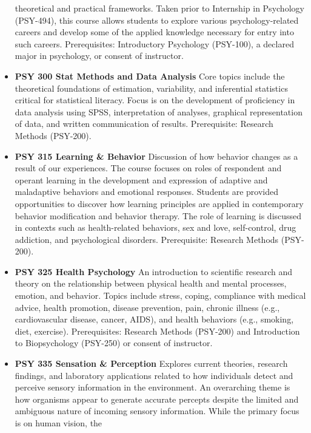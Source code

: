 \documentclass[
  letterpaper,
]{scrbook}
\begin{document}
\begin{itemize}
  theoretical and practical frameworks. Taken prior to Internship in
  Psychology (PSY-494), this course allows students to explore various
  psychology-related careers and develop some of the applied knowledge
  necessary for entry into such careers. Prerequisites: Introductory
  Psychology (PSY-100), a declared major in psychology, or consent of
  instructor.\\
\item
  \textbf{PSY 300 Stat Methods and Data Analysis} Core topics include
  the theoretical foundations of estimation, variability, and
  inferential statistics critical for statistical literacy. Focus is on
  the development of proficiency in data analysis using SPSS,
  interpretation of analyses, graphical representation of data, and
  written communication of results. Prerequisite: Research Methods
  (PSY-200).
\item
  \textbf{PSY 315 Learning \& Behavior} Discussion of how behavior
  changes as a result of our experiences. The course focuses on roles of
  respondent and operant learning in the development and expression of
  adaptive and maladaptive behaviors and emotional responses. Students
  are provided opportunities to discover how learning principles are
  applied in contemporary behavior modification and behavior therapy.
  The role of learning is discussed in contexts such as health-related
  behaviors, sex and love, self-control, drug addiction, and
  psychological disorders. Prerequisite: Research Methods (PSY-200).\\
\item
  \textbf{PSY 325 Health Psychology} An introduction to scientific
  research and theory on the relationship between physical health and
  mental processes, emotion, and behavior. Topics include stress,
  coping, compliance with medical advice, health promotion, disease
  prevention, pain, chronic illness (e.g., cardiovascular disease,
  cancer, AIDS), and health behaviors (e.g., smoking, diet, exercise).
  Prerequisites: Research Methods (PSY-200) and Introduction to
  Biopsychology (PSY-250) or consent of instructor.
\item
  \textbf{PSY 335 Sensation \& Perception} Explores current theories,
  research findings, and laboratory applications related to how
  individuals detect and perceive sensory information in the
  environment. An overarching theme is how organisms appear to generate
  accurate percepts despite the limited and ambiguous nature of incoming
  sensory information. While the primary focus is on human vision, the

\end{itemize}
\end{document}
